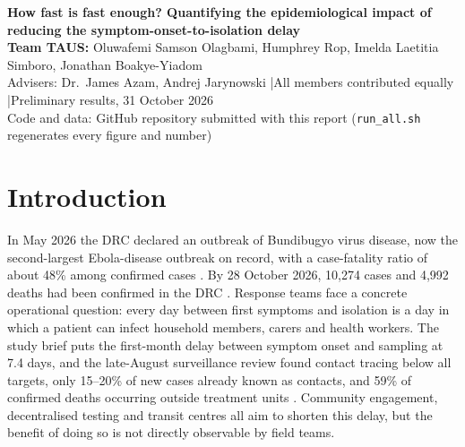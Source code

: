 \documentclass[10pt,a4paper]{article}
\begin{document}
\begin{center}
{\Large\bfseries How fast is fast enough? Quantifying the epidemiological impact of reducing the symptom-onset-to-isolation delay}\\[3pt]
{\bfseries Team TAUS:} Oluwafemi Samson Olagbami, Humphrey Rop, Imelda Laetitia Simboro, Jonathan Boakye-Yiadom\\
{\small Advisers: Dr.\ James Azam, Andrej Jarynowski \quad|\quad All members contributed equally \quad|\quad Preliminary results, 31 October 2026\\
Code and data: GitHub repository submitted with this report (\texttt{run\_all.sh} regenerates every figure and number)}
\end{center}
\vspace{-4pt}
\begin{abstract}\noindent
\textbf{Abstract.} The 2026 Bundibugyo virus disease (BVD) outbreak in the Democratic Republic of the Congo (DRC) has passed 10,000 confirmed cases, and confirmed incidence has stayed near 70 per day since August. We asked how many cases would be prevented, and how much sooner the outbreak would end, if the mean delay from symptom onset to isolation fell from 7 to 5 or 3 days, with isolation that is 50\%, 80\% or 100\% effective. We built a deterministic SEIQR model with an isolation rate equal to one over the delay, calibrated it to the observed flat incidence (effective reproduction number $R_e\approx1.0$), and propagated uncertainty through 1,000 parameter draws and a stochastic check. Over 12 months, a 5-day delay averts 52--86\% of cases and a 3-day delay 77--95\% (95\% uncertainty intervals 38--99\%), depending on isolation effectiveness. At 80\% effectiveness, a 3-day delay brings $R_e$ to 0.74 and ends the outbreak in about 9 months, versus about 24 months at 5 days; at 7 days it does not end.
\end{abstract}

\section{Introduction}
In May 2026 the DRC declared an outbreak of Bundibugyo virus disease, now the second-largest Ebola-disease outbreak on record, with a case-fatality ratio of about 48\% among confirmed cases \cite{zomahoun,kabasele}. By 28 October 2026, 10,274 cases and 4,992 deaths had been confirmed in the DRC \cite{cdc}. Response teams face a concrete operational question: every day between first symptoms and isolation is a day in which a patient can infect household members, carers and health workers. The study brief puts the first-month delay between symptom onset and sampling at 7.4 days, and the late-August surveillance review found contact tracing below all targets, only 15--20\% of new cases already known as contacts, and 59\% of confirmed deaths occurring outside treatment units \cite{kabasele}. Community engagement, decentralised testing and transit centres all aim to shorten this delay, but the benefit of doing so is not directly observable by field teams.
\end{document}
